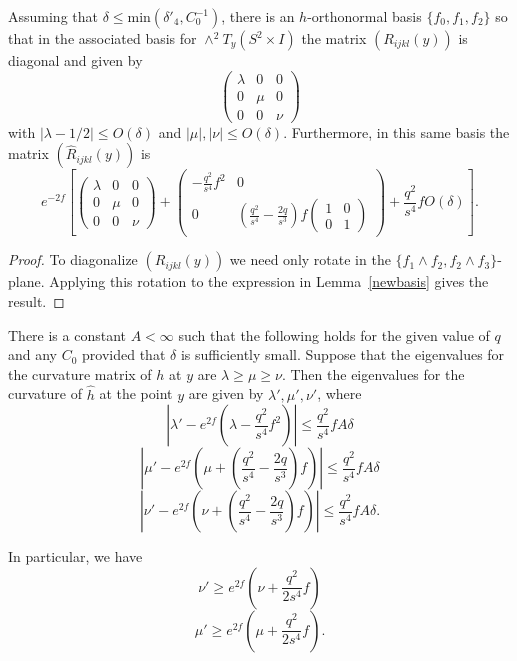 \begin{corollary}
\label{cor:diagonalized-curvature-matrices}\label{13.10}
Assuming that $\delta\le \mathrm{min}(\delta'_4,C_0^{-1})$, there is an
$h$-orthonormal basis $\{f_0,f_1,f_2\}$ so that in the associated basis for
$\wedge^2T_y(S^2\times I)$ the matrix $(R_{ijkl}(y))$ is diagonal and given by
$$\begin{pmatrix} \lambda & 0 & 0 \\ 0 & \mu & 0 \\ 0 & 0 &
\nu\end{pmatrix}$$ with $|\lambda-1/2|\le O(\delta)$ and
$|\mu|,|\nu|\le O(\delta)$. Furthermore, in this same basis the
matrix  $(\hat R_{ijkl}(y))$ is
$$e^{-2f}\left[\begin{pmatrix}\lambda & 0 & 0 \\ 0 & \mu & 0 \\ 0 & 0 &
\nu\end{pmatrix}+\begin{pmatrix} -\frac{q^2}{s^4}f^2 & 0  \\ 0 &
\left(\frac{q^2}{s^4}-\frac{2q}{s^3}\right)f\begin{pmatrix} 1 & 0 \\
0 & 1\end{pmatrix}\end{pmatrix}+\frac{q^2}{s^4}fO(\delta)\right].$$
\end{corollary}

\begin{proof}
To diagonalize $(R_{ijkl}(y))$ we need only rotate in the
$\{f_1\wedge f_2,f_2\wedge f_3\}$-plane. Applying this rotation to
the expression in Lemma~\ref{newbasis} gives the result.
\end{proof}


\begin{corollary}
\label{cor:conformal-eigenvalue-estimates}\label{improve}
There is a constant $A<\infty$ such that the following holds for the given value of $q$
and any $C_0$ provided that $\delta$ is sufficiently small.
Suppose that the eigenvalues for the curvature matrix of $h$ at $y$
are $\lambda\ge \mu\ge \nu$.
Then the eigenvalues for the curvature of $\hat h$ at the point $y$
are given by $\lambda',\mu',\nu'$, where
$$\left|\lambda'-e^{2f}\left(\lambda-\frac{q^2}{s^4}f^2\right)\right|
\le \frac{q^2}{s^4}fA\delta$$
$$\left|\mu'-e^{2f}\left(\mu+\left(\frac{q^2}{s^4}-\frac{2q}{s^3}\right)f\right)\right|\le
\frac{q^2}{s^4}fA\delta$$
$$\left|\nu'-e^{2f}\left(\nu+\left(\frac{q^2}{s^4}-\frac{2q}{s^3}\right)f\right)\right|\le
\frac{q^2}{s^4}fA\delta.$$

In particular, we have
$$\nu'\ge e^{2f}\left(\nu+\frac{q^2}{2s^4}f\right)$$
$$\mu'\ge e^{2f}\left(\mu+\frac{q^2}{2s^4}f\right).$$
\end{corollary}

